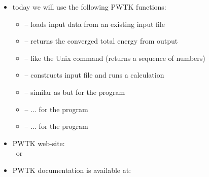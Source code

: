 \documentclass[landscape]{foils}
\begin{document}
\begin{itemize}
\item today we will use the following PWTK functions:
  \begin{itemize}
  \item {} -- loads input data from an existing
     input file
    \vspace{0.2em}
  \item {} -- returns the converged total energy
    from  output\vspace{0.2em}
  \item {} -- like the Unix  command (returns a
    sequence of numbers)\vspace{0.2em}
  \item {} -- constructs  input file and runs a calculation
    \vspace{0.2em}
  \item {} -- similar as  but for the  program
    \vspace{0.2em}
  \item {} -- ... for the  program
    \vspace{0.2em}
  \item {} -- ... for the  program
  \end{itemize}
\item PWTK web-site:\\
   ~or~ 
  \item PWTK documentation is available at:\\
\end{itemize}
\end{document}

